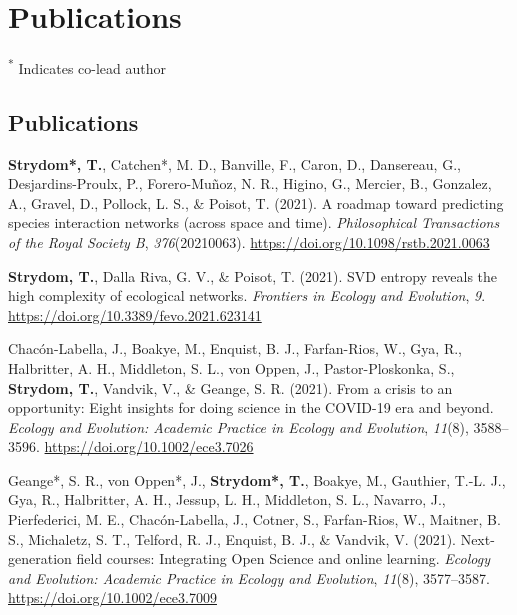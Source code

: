 \documentclass[11pt, a4paper]{awesome-cv}
\begin{document}
\newpage

\hypertarget{publications}{%
\section{Publications}\label{publications}}

\textsuperscript{*} Indicates co-lead author

\vspace{\baselineskip}

\hypertarget{publications-1}{%
\subsection{\texorpdfstring{\textbf{Publications}}{Publications}}\label{publications-1}}

\begingroup
\setlength{\parindent}{-0.5in}
\setlength{\leftskip}{0.5in}

\hypertarget{refs_journals}{}
\leavevmode\hypertarget{ref-StrydomPriPre2021}{}%
\textbf{Strydom*, T.}, Catchen*, M. D., Banville, F., Caron, D.,
Dansereau, G., Desjardins-Proulx, P., Forero-Muñoz, N. R., Higino, G.,
Mercier, B., Gonzalez, A., Gravel, D., Pollock, L. S., \& Poisot, T.
(2021). A roadmap toward predicting species interaction networks (across
space and time). \emph{Philosophical Transactions of the Royal Society
B}, \emph{376}(20210063). \url{https://doi.org/10.1098/rstb.2021.0063}

\leavevmode\hypertarget{ref-StrydomSVDEnt2020}{}%
\textbf{Strydom, T.}, Dalla Riva, G. V., \& Poisot, T. (2021). SVD
entropy reveals the high complexity of ecological networks.
\emph{Frontiers in Ecology and Evolution}, \emph{9}.
\url{https://doi.org/10.3389/fevo.2021.623141}

\leavevmode\hypertarget{ref-Chac_2020}{}%
Chacón-Labella, J., Boakye, M., Enquist, B. J., Farfan-Rios, W., Gya,
R., Halbritter, A. H., Middleton, S. L., von Oppen, J.,
Pastor-Ploskonka, S., \textbf{Strydom, T.}, Vandvik, V., \& Geange, S.
R. (2021). From a crisis to an opportunity: {Eight} insights for doing
science in the {COVID}-19 era and beyond. \emph{Ecology and Evolution:
Academic Practice in Ecology and Evolution}, \emph{11}(8), 3588--3596.
\url{https://doi.org/10.1002/ece3.7026}

\leavevmode\hypertarget{ref-Geange_2020}{}%
Geange*, S. R., von Oppen*, J., \textbf{Strydom*, T.}, Boakye, M.,
Gauthier, T.-L. J., Gya, R., Halbritter, A. H., Jessup, L. H.,
Middleton, S. L., Navarro, J., Pierfederici, M. E., Chacón-Labella, J.,
Cotner, S., Farfan-Rios, W., Maitner, B. S., Michaletz, S. T., Telford,
R. J., Enquist, B. J., \& Vandvik, V. (2021). Next-generation field
courses: {Integrating Open Science} and online learning. \emph{Ecology
and Evolution: Academic Practice in Ecology and Evolution},
\emph{11}(8), 3577--3587. \url{https://doi.org/10.1002/ece3.7009}
\end{document}
